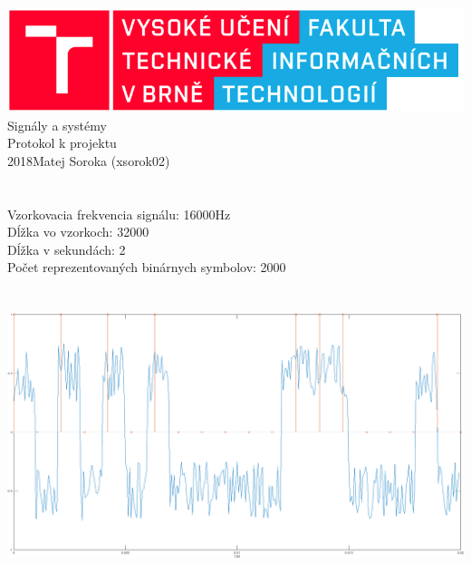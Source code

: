 \documentclass[a4paper,12pt,twocolumn]{article}
\begin{document}
\begin{titlepage}
  \begin{center}
	\includegraphics[origin=c,scale=0.5]{fit}
	\\[60mm]
    {\Huge Signály a systémy}\\[5mm]
	{\Huge Protokol k projektu}\\[5mm]
    \Large{2018}\hfill Matej Soroka (xsorok02)
  \end{center}
\end{titlepage}

\section{}
Vzorkovacia frekvencia signálu: 16000Hz\\
Dĺžka vo vzorkoch: 32000\\
Dĺžka v sekundách: 2\\
Počet reprezentovaných binárnych symbolov: 2000
\section{}
\includegraphics[width=\linewidth]{2}
\end{document}
